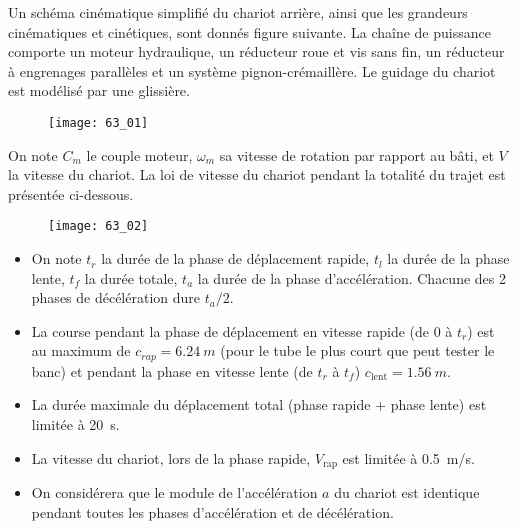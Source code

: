 \normaltrue
\correctionfalse


\setcounter{question}{0}
\ifcorrection
\else
{}
\fi

\ifprof
\else
Un schéma cinématique simplifié du chariot arrière, ainsi que les grandeurs cinématiques et cinétiques,
sont donnés figure suivante.
La chaîne de puissance comporte un moteur hydraulique, un réducteur roue et vis sans fin, un réducteur à
engrenages parallèles et un système pignon-crémaillère.
Le guidage du chariot est modélisé par une glissière.



\begin{figure}[H]
\centering
\texttt{[image: 63\_01]}
\end{figure}


On note $C_m$  le couple moteur, $\omega_m$ sa vitesse de rotation par rapport au bâti, et $V$ la vitesse du chariot.
La loi de vitesse du chariot pendant la totalité du trajet est présentée ci-dessous.

\begin{figure}[H]
\centering
\texttt{[image: 63\_02]}
\end{figure}


\begin{itemize}
\item On note $t_r$ la durée de la phase de déplacement rapide, $t_l$ la durée de la phase lente, $t_f$ la durée
totale, $t_a$ la durée de la phase d'accélération. Chacune des 2 phases de décélération dure $t_a/2$.
\item La course pendant la phase de déplacement en vitesse rapide (de 0 à $t_r$) est au maximum de
$c_{rap}= \SI{6,24}{m}$ (pour le tube le plus court que peut tester le banc) et pendant la phase en vitesse
lente (de $t_r$ à $t_f$) $c_{\text{lent}}= \SI{1,56}{m}$.
\item La durée maximale du déplacement total (phase rapide + phase lente) est limitée à \SI{20}{s}.
\item La vitesse du chariot, lors de la phase rapide, $V_{\text{rap}}$ est limitée à \SI{0,5}{m/s}.
\item On considérera que le module de l'accélération $a$ du chariot est identique pendant toutes les
phases d'accélération et de décélération.
\end{itemize}

